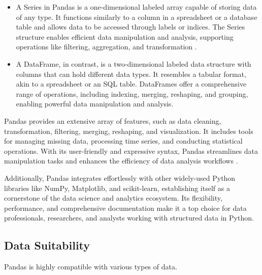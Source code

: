\begin{itemize}
	
	\item A Series in Pandas is a one-dimensional labeled array capable of storing data of any type. It functions similarly to a column in a spreadsheet or a database table and allows data to be accessed through labels or indices. The Series structure enables efficient data manipulation and analysis, supporting operations like filtering, aggregation, and transformation \cite{McKinney:2011}.
	
	\item A DataFrame, in contrast, is a two-dimensional labeled data structure with columns that can hold different data types. It resembles a tabular format, akin to a spreadsheet or an SQL table. DataFrames offer a comprehensive range of operations, including indexing, merging, reshaping, and grouping, enabling powerful data manipulation and analysis.
	
\end{itemize}

Pandas provides an extensive array of features, such as data cleaning, transformation, filtering, merging, reshaping, and visualization. It includes tools for managing missing data, processing time series, and conducting statistical operations. With its user-friendly and expressive syntax, Pandas streamlines data manipulation tasks and enhances the efficiency of data analysis workflows \cite{Heydt:2017}.

Additionally, Pandas integrates effortlessly with other widely-used Python libraries like NumPy, Matplotlib, and scikit-learn, establishing itself as a cornerstone of the data science and analytics ecosystem. Its flexibility, performance, and comprehensive documentation make it a top choice for data professionals, researchers, and analysts working with structured data in Python.

\subsection{Data Suitability}

Pandas is highly compatible with various types of data.

